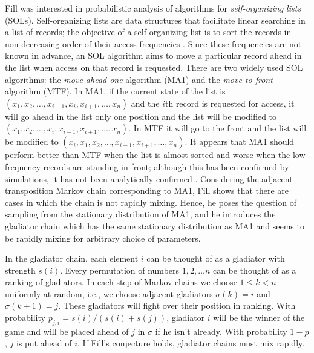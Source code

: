 \documentclass[10 pt]{article}
\begin{document}
Fill was interested in probabilistic analysis of algorithms for \emph{self-organizing lists} (SOLs). Self-organizing lists are data structures 
that facilitate linear searching in a list of records; the objective of a self-organizing list is to sort the records in non-decreasing order
of their access frequencies \cite{Self1}. Since these frequencies are not known in advance, an SOL algorithm aims to move a particular
record ahead in the list when access on that record is requested. There are two widely used SOL algorithms: the \emph{move ahead one}
algorithm (MA1) and the \emph{move to  front }algorithm (MTF). In MA1, if the current state of the list is
$(x_1,x_2,\dots,x_{i-1}, x_i,x_{i+1},\dots , x_n)$ and the $i$th record is requested for access,  it will go ahead in the list only one
position and the list will be modified to $(x_1,x_2,\dots,x_i,x_{i-1},x_{i+1},\dots, x_n)$.  In MTF it will go to the front and the
list will be modified to $(x_{i},x_1,x_2,\dots,x_{i-1},x_{i+1},\dots, x_n)$. It appears that  MA1 should perform better than MTF when the
list is almost sorted and worse when the low frequency records are standing in front; although this has been confirmed by simulations,
it has not been analytically confirmed \cite{Self2}.  Considering the adjacent transposition Markov chain corresponding to MA1, Fill shows
\cite{FillConj} that there are cases in which the chain is not rapidly mixing. Hence, he poses the question of sampling from the stationary
distribution of MA1, and he introduces the gladiator chain which has the same stationary distribution as MA1 and seems to be rapidly mixing for arbitrary
choice of parameters.

In the gladiator chain, each element $i$ can be thought of as a gladiator with strength $s(i)$. Every permutation of numbers $1,2,\dots n$
can be thought of as a ranking of gladiators. In each step of Markov chains we choose $1\leq k < n$ uniformly at random, i.e., we choose
adjacent gladiators $\sigma(k)=i$ and $\sigma(k+1)=j$. These gladiators will fight over their position in ranking. With probability
$p_{j,i}=s(i)/(s(i)+s(j))$, gladiator $i$ will be the winner of the game and will be placed ahead of $j$ in $\sigma$ if he isn't already.
With probability $1{-}p$, $j$ is put ahead of $i$.  If Fill's conjecture holds, gladiator chains must mix rapidly. 
 \medskip
 
 
 
\end{document}
